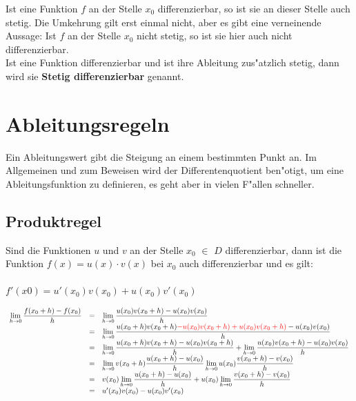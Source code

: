 Ist eine Funktion $f$ an der Stelle $x_{0}$ differenzierbar, so ist sie an dieser Stelle auch stetig.
Die Umkehrung gilt erst einmal nicht, aber es gibt eine verneinende Aussage: Ist $f$ an der Stelle $x_{0}$ nicht stetig, so ist sie hier auch nicht differenzierbar.\\

Ist eine Funktion differenzierbar und ist ihre Ableitung zus"atzlich stetig, dann wird sie \textbf{Stetig differenzierbar} genannt. 

\section{Ableitungsregeln}


Ein Ableitungswert gibt die Steigung an einem bestimmten Punkt an. Im Allgemeinen und zum Beweisen wird der Differentenquotient ben"otigt, um eine Ableitungsfunktion zu definieren, es geht aber in vielen F"allen schneller.

\subsection{Produktregel}
\begin{Definition}
Sind die Funktionen $u$ und $v$ an der Stelle $x_{0}$ $\in$ $D$ differenzierbar, dann ist die Funktion $f(x)=u(x)\cdot v(x)$ bei $x_{0}$ auch differenzierbar und es gilt: \\
\\
$f'(x0) = u'(x_{0})v(x_{0})+u(x_{0})v'(x_{0})$\\
\end{Definition}
\begin{Beweis}
$
\begin{array}{rcl}
\lim\limits_{h \rightarrow 0} {\dfrac{f(x_{0}+h)-f(x_{0})}{h}} & = & \lim\limits_{h \rightarrow 0} {\dfrac{u(x_{0})v({x_{0}+h)-u(x_{0})v(x_{0})}}{h}}\\
&=&\lim\limits_{h \rightarrow 0} {\dfrac{u(x_{0}+h)v(x_{0}+h)\textcolor{red}{-u(x_{0})v(x_{0}+h)+u(x_{0})v(x_{0}+h)}-u(x_{0})v(x_{0}) }{h}}\\
&=&\lim\limits_{h \rightarrow 0} {\dfrac{u(x_{0}+h)v(x_{0}+h)-u(x_{0})v(x_{0}+h)}{h}} + \lim\limits_{h \rightarrow 0} {\dfrac{u(x_{0})v(x_{0}+h)-u(x_{0})v(x_{0})}{h}}\\
&=&\lim\limits_{h \rightarrow 0} {v(x_{0}+h)\dfrac{u(x_{0}+h)-u(x_{0})}{h}} \lim\limits_{h \rightarrow 0} {u(x_{0})\dfrac{v(x_{0}+h)-v(x_{0})}{h}}\\
&=& v(x_{0})\lim\limits_{h \rightarrow 0}{\dfrac{u(x_{0}+h)-u(x_{0})}{h}} +u(x_{0}) \lim\limits_{h \rightarrow 0} {\dfrac{v(x_{0}+h)-v(x_{0})}{h}}\\
&=& u'(x_{0})v(x_{0}) - u(x_{0})v'(x_{0})
\end{array}
$
\end{Beweis}

